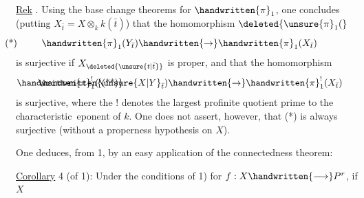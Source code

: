 \uline{Rek} . Using the base change theorems for $\handwritten{\pi}_1$, one concludes  (putting $X_{\bar{t}}=X\otimes_k k(\bar{t})$) that the homomorphism $\deleted{\unsure{\pi}_1(}$
\[
\handwritten{\pi}_1(Y_{\bar{t}})\handwritten{\rightarrow}\handwritten{\pi}_1(X_{\bar{t}})\tag*{\makebox[0pt][r]{\makebox[\linewidth][l]{(*)}}}
\]
is surjective if $X_{\deleted{\unsure{t|\bar{t}}}}$ is proper, and that the homomorphism
\[
\handwritten{\pi}_1^{!}(\unsure{X|Y}_{\bar{t}})\handwritten{\rightarrow}\handwritten{\pi}_1^{!}(X_{\bar{t}})\tag*{\makebox[0pt][r]{\makebox[\linewidth][l]{\handwritten{(**)}}}}
\]
is surjective, where the ! denotes the largest profinite quotient prime to the characteristic\ eponent of $k$. One does not assert, however, that (*) is always surjective (without a properness hypothesis on $X$).

One deduces, from 1, by an easy application of the connectedness theorem:

\uline{Corollary} 4 (of 1): Under the conditions of 1) for $f:X\handwritten{\longrightarrow}P^r$, if $X$
